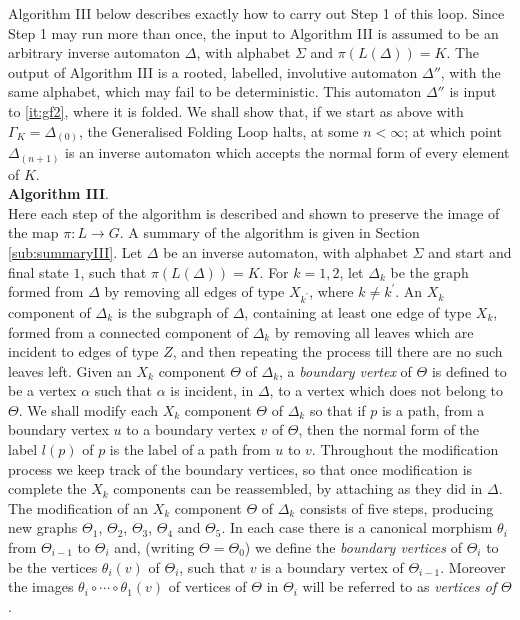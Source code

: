 \documentclass[a4paper,12pt]{article}
\renewcommand{\a}{\alpha }
\newcommand{\G}{\Gamma }
\newcommand{\D}{\Delta }
\newcommand{\T}{\Theta }
\renewcommand{\S}{\Sigma }
\numberwithin{equation}{section}
\numberwithin{figure}{section}
\newcommand{\maps}{\rightarrow}
\begin{document}
Algorithm III below describes exactly how to carry out Step 1 of
this loop. Since Step 1 may run more than once,  the input to 
Algorithm III is assumed to be an arbitrary inverse automaton $\D$,
with alphabet $\S$ and $\pi(L(\D))=K$. The output of Algorithm III
is a rooted,
labelled, involutive automaton $\D''$, with the same alphabet, which may
fail to be deterministic. This automaton $\D''$ is input to \ref{it:gf2}, 
where it is folded. We shall show that, if we start as above
with $\G_K=\D_{(0)}$,  the Generalised Folding Loop halts, at some $n<\infty$; at
which point $\D_{(n+1)}$ is an inverse automaton which accepts the
normal form of every element of $K$. \\[1em]

\noindent\textbf{Algorithm III}. \\

Here each step of the algorithm is described and shown to preserve the image of the map $\pi:L \maps G$.
A  
summary of the algorithm is given in Section \ref{sub:summaryIII}.  
Let $\D$ be an inverse automaton, with alphabet $\S$ and
start and final state $1$, such that
$\pi(L(\D))=K$.
For $k=1,2$, let $\D_k$ be the graph formed from $\D$ by removing all edges of
type $X_{k^\prime}$, where $k\neq k^\prime$. An $X_k$ component of
$\D_k$ is the subgraph of $\D$, containing at least one edge of type $X_k$, 
 formed from a connected component
of $\D_k$ by removing all leaves which are incident to edges of
type $Z$, and then repeating the process till there are no such
leaves left. Given an $X_k$ component $\T$ of $\D_k$,  a
{\em boundary vertex} of $\T$ is defined to be a vertex
$\a$ such that $\a$ is incident, in $\D$, to a vertex which does not
belong to $\T$.
 We shall modify each  $X_k$ component $\T$ of $\D_k$ so that if $p$ is a path,
from a  boundary vertex $u$  to a boundary vertex $v$ of $\T$,
then the normal form  of  the label $l(p)$ of $p$ is the label of
a path from $u$ to $v$. Throughout the modification process we
keep track of the boundary vertices, so that once modification is
complete the $X_k$ components can be reassembled, by attaching as
they did in $\D$. The modification of an $X_k$ component $\Theta$
of $\D_k$ consists of
five steps, producing new graphs $\T_1$, $\T_2$, $\T_3$, $\T_4$
and $\T_5$. In each case there is a canonical morphism $\theta_i$
from $\T_{i-1}$ to $\T_i$ and,
 (writing $\T=\T_0$)
we define the {\em boundary vertices} of $\T_{i}$ to be the vertices $\theta_{i}(v)$
of $\T_i$, such that $v$ is a boundary vertex of $\T_{i-1}$. Moreover the
 images $\theta_i\circ \cdots\circ \theta_1(v)$ of vertices of $\T$ in $\T_i$
will be referred to as  {\em vertices of} $\T$.
\end{document}
